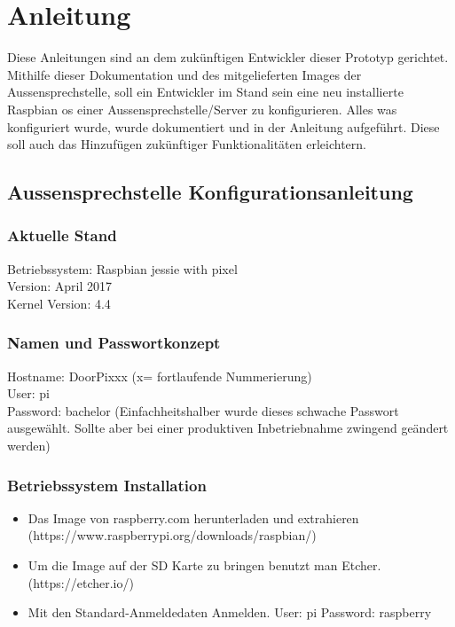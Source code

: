 \section{Anleitung}
\label{sec:anleitung}
Diese Anleitungen sind an dem zukünftigen Entwickler dieser Prototyp gerichtet. Mithilfe dieser Dokumentation und des mitgelieferten Images der Aussensprechstelle, soll ein Entwickler im Stand sein eine neu installierte Raspbian \gls{os} einer Aussensprechstelle/Server zu konfigurieren. Alles was konfiguriert wurde, wurde dokumentiert und in der Anleitung aufgeführt. Diese soll auch das Hinzufügen zukünftiger Funktionalitäten erleichtern.

\subsection{Aussensprechstelle Konfigurationsanleitung}

\subsubsection{Aktuelle Stand}
Betriebssystem:	Raspbian jessie with pixel\\
Version: April 2017\\
Kernel Version: 4.4

\subsubsection{Namen und Passwortkonzept}
Hostname: DoorPixxx (x= fortlaufende Nummerierung)\\
User: pi\\
Password: bachelor (Einfachheitshalber wurde dieses schwache Passwort ausgewählt. Sollte aber bei einer produktiven Inbetriebnahme zwingend geändert werden)\\

\subsubsection{Betriebssystem Installation}
\begin{itemize}
	\item Das Image von raspberry.com herunterladen und extrahieren (https://www.raspberrypi.org/downloads/raspbian/)
	\item Um die Image auf der SD Karte zu bringen benutzt man Etcher.  (https://etcher.io/)
	\item Mit den Standard-Anmeldedaten Anmelden. User: pi Password: raspberry
\end{itemize}



